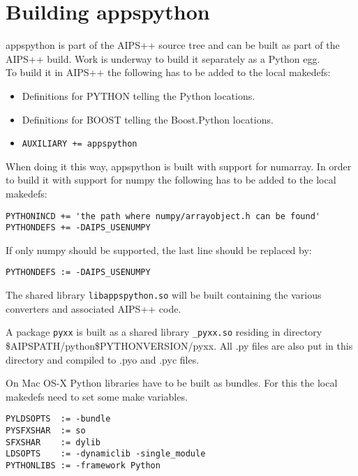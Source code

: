 \section{Building appspython}
appspython is part of the AIPS++ source tree and can be built as part of
the AIPS++ build. Work is underway to build it separately as a Python
egg.
\\To build it in AIPS++ the following has to be added to the local
makedefs:
\begin{itemize}
\item Definitions for PYTHON telling the Python locations.
\item Definitions for BOOST telling the Boost.Python locations.
\item \texttt{AUXILIARY += appspython}
\end{itemize}
When doing it this way, appspython is built with support for
numarray. In order to build it with support for numpy the following
has to be added to the local makedefs:
\begin{verbatim}
PYTHONINCD += 'the path where numpy/arrayobject.h can be found'
PYTHONDEFS += -DAIPS_USENUMPY
\end{verbatim}
If only numpy should be supported, the last line should be replaced by:
\begin{verbatim}
PYTHONDEFS := -DAIPS_USENUMPY
\end{verbatim}
The shared library \texttt{libappspython.so} will be built
containing the various converters and associated AIPS++ code.

A package \texttt{pyxx} is built as a shared library
\texttt{\_pyxx.so} residing in directory 
\$AIPSPATH/python\$PYTHONVERSION/pyxx. All .py files are also put in this
directory and compiled to .pyo and .pyc files.

On Mac OS-X Python libraries have to be built as bundles. For this the
local makedefs need to set some make variables.
\begin{verbatim}
PYLDSOPTS  := -bundle
PYSFXSHAR  := so
SFXSHAR    := dylib
LDSOPTS    := -dynamiclib -single_module
PYTHONLIBS := -framework Python
\end{verbatim}

